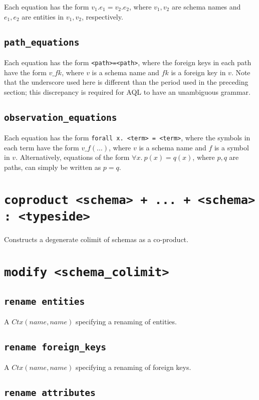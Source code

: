 \documentclass[10pt]{book}
\begin{document}
Each equation has the form $v_1.e_1 = v_2.e_2$, where $v_1, v_2$ are schema names and $e_1, e_2$ are entities in $v_1, v_2$, respectively.

\subsection{{\tt path\_equations}}

Each equation has the form {\tt <path>=<path>}, where the foreign keys in each path have the form $v\_fk$, where $v$ is a schema name and $fk$ is a foreign key in $v$.  Note that the underscore used here is different than the period used in the preceding section; this discrepancy is required for AQL to have an unambiguous grammar.

\subsection{{\tt observation\_equations}}

Each equation has the form {\tt forall x. <term> = <term>}, where the symbols in each term have the form $v\_f(\ldots)$, where $v$ is a schema name and $f$ is a symbol in $v$.   Alternatively, equations of the form $\forall x. \ p(x) = q(x)$, where $p,q$ are paths, can simply be written as $p = q$.

\section{{\tt coproduct <schema> + ... + <schema> : <typeside>}}

Constructs a degenerate colimit of schemas as a co-product. 

\section{\tt modify <schema\_colimit>}

\subsection{{\tt rename entities}}
A $Ctx(name,name)$ specifying a renaming of entities.

\subsection{{\tt rename foreign\_keys}}
A $Ctx(name,name)$ specifying a renaming of foreign keys. 

\subsection{{\tt rename attributes}}
\end{document}
